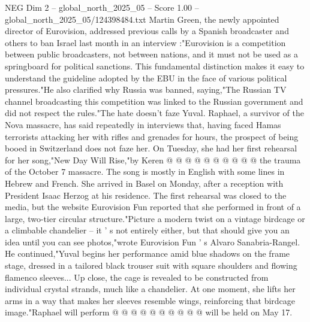 \begin{textsample}{NEG Dim 2 – global\_north\_2025\_05 – Score 1.00 – global\_north\_2025\_05/124398484.txt}
Martin Green, the newly appointed director of Eurovision, addressed previous calls by a Spanish broadcaster and others to ban Israel last month in an interview :"Eurovision is a competition between public broadcasters, not between nations, and it must not be used as a springboard for political sanctions.
This fundamental distinction makes it easy to understand the guideline adopted by the EBU in the face of various political pressures."He also clarified why Russia was banned, saying,"The Russian TV channel broadcasting this competition was linked to the Russian government and did not respect the rules."The hate doesn't faze Yuval.
Raphael, a survivor of the Nova massacre, has said repeatedly in interviews that, having faced Hamas terrorists attacking her with rifles and grenades for hours, the prospect of being booed in Switzerland does not faze her.
On Tuesday, she had her first rehearsal for her song,"New Day Will Rise,"by Keren @ @ @ @ @ @ @ @ @ @ the trauma of the October 7 massacre.
The song is mostly in English with some lines in Hebrew and French.
She arrived in Basel on Monday, after a reception with President Isaac Herzog at his residence.
The first rehearsal was closed to the media, but the website Eurovision Fun reported that she performed in front of a large, two-tier circular structure."Picture a modern twist on a vintage birdcage or a climbable chandelier -- it ' s not entirely either, but that should give you an idea until you can see photos,"wrote Eurovision Fun ' s Alvaro Sanabria-Rangel.
He continued,"Yuval begins her performance amid blue shadows on the frame stage, dressed in a tailored black trouser suit with square shoulders and flowing flamenco sleeves...
Up close, the cage is revealed to be constructed from individual crystal strands, much like a chandelier.
At one moment, she lifts her arms in a way that makes her sleeves resemble wings, reinforcing that birdcage image."Raphael will perform @ @ @ @ @ @ @ @ @ @ will be held on May 17.

\end{textsample}
